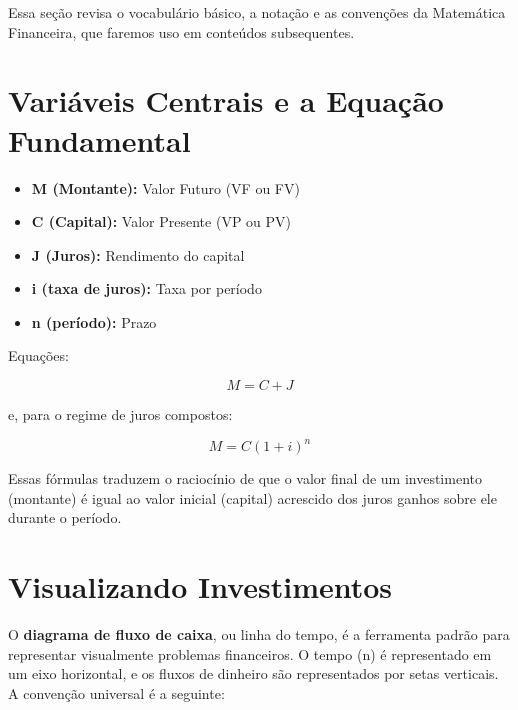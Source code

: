 \documentclass[
  a4paper,
]{book}
\providecommand{\tightlist}{%
  \setlength{\itemsep}{0pt}\setlength{\parskip}{0pt}}\usepackage{longtable,booktabs,array}
\begin{document}
\begin{tcolorbox}[enhanced jigsaw, left=2mm, title=\textcolor{quarto-callout-note-color}{\faInfo}\hspace{0.5em}{Linguagem da Matemática Financeira}, colback=white, colframe=quarto-callout-note-color-frame, arc=.35mm, rightrule=.15mm, bottomrule=.15mm, breakable, bottomtitle=1mm, toptitle=1mm, coltitle=black, toprule=.15mm, leftrule=.75mm, colbacktitle=quarto-callout-note-color!10!white, opacitybacktitle=0.6, opacityback=0, titlerule=0mm]

Essa seção revisa o vocabulário básico, a notação e as convenções da
Matemática Financeira, que faremos uso em conteúdos subsequentes.

\section*{Variáveis Centrais e a Equação
Fundamental}\label{variuxe1veis-centrais-e-a-equauxe7uxe3o-fundamental}


\begin{itemize}
\tightlist
\item
  \textbf{M (Montante):} Valor Futuro (VF ou FV)
\item
  \textbf{C (Capital):} Valor Presente (VP ou PV)
\item
  \textbf{J (Juros):} Rendimento do capital
\item
  \textbf{i (taxa de juros):} Taxa por período
\item
  \textbf{n (período):} Prazo
\end{itemize}

Equações:

\[
M = C + J
\]

e, para o regime de juros compostos:

\[
M = C (1 + i)^n
\]

Essas fórmulas traduzem o raciocínio de que o valor final de um
investimento (montante) é igual ao valor inicial (capital) acrescido dos
juros ganhos sobre ele durante o período.

\section*{Visualizando Investimentos}\label{visualizando-investimentos}


O \textbf{diagrama de fluxo de caixa}, ou linha do tempo, é a ferramenta
padrão para representar visualmente problemas financeiros. O tempo (n) é
representado em um eixo horizontal, e os fluxos de dinheiro são
representados por setas verticais. A convenção universal é a seguinte:


\end{tcolorbox}
\end{document}
